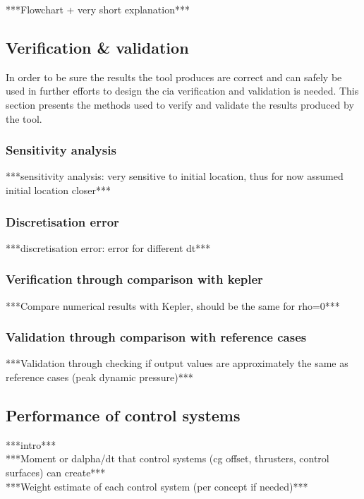 ***Flowchart + very short explanation***\\

\subsection{Verification \& validation}
\label{sec:astrovv}
In order to be sure the results the tool produces are correct and can safely be used in further efforts to design the \gls{cia} verification and validation is needed. This section presents the methods used to verify and validate the results produced by the tool.
\subsubsection{Sensitivity analysis}
\label{sec:astrosens}
***sensitivity analysis: very sensitive to initial location, thus for now assumed initial location closer***\\
\subsubsection{Discretisation error}
\label{sec:astrodisc}
***discretisation error: error for different dt***\\
\subsubsection{Verification through comparison with kepler}
\label{sec:astroverf}
***Compare numerical results with Kepler, should be the same for rho=0***\\
\subsubsection{Validation through comparison with reference cases}
\label{sec:astroval}
***Validation through checking if output values are approximately the same as reference cases (peak dynamic pressure)***\\

\subsection{Performance of control systems}
 \label{sec:astroref}
***intro***\\
***Moment or dalpha/dt that control systems (cg offset, thrusters, control surfaces) can create***\\
***Weight estimate of each control system (per concept if needed)***\\

